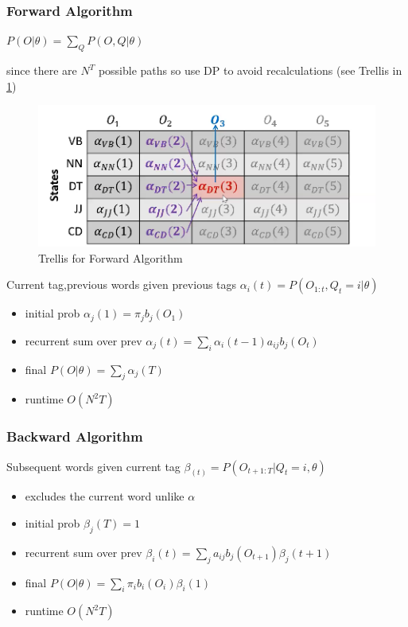 \documentclass[]{article}
\theoremstyle{definition}
\begin{document}
\subsubsection{Forward Algorithm}%
\label{ssub:forward_algorithm}

$P(O|\theta) = \sum_Q P(O,Q|\theta)$

since there are $N^T$ possible paths so use DP to avoid recalculations (see Trellis in \ref{fig:forward-trellis})

\begin{figure}[h]
    \centering
    \includegraphics[width=0.8\linewidth]{comp550/forward.png}
    \caption{Trellis for Forward Algorithm}%
    \label{fig:forward-trellis}
\end{figure}

Current tag,previous words given previous tags $\alpha_i(t) = P(O_{1:t},Q_t = i | \theta)$
\begin{itemize}
    \item initial prob $\alpha_j(1) = \pi_j b_j(O_1)$
    \item recurrent sum over prev $\alpha_j(t) = \sum_i \alpha_i(t-1) a_{ij} b_j(O_t)$
    \item final $P(O|\theta) = \sum_j \alpha_j(T)$
    \item runtime $O(N^2T)$
\end{itemize}

\subsubsection{Backward Algorithm}%
\label{ssub:backward_algorithm}

Subsequent words given current tag $\beta_(t) = P(O_{t+1:T} | Q_t = i, \theta)$
\begin{itemize}
    \item excludes the current word unlike $\alpha$
    \item initial prob $\beta_j(T) = 1$
    \item recurrent sum over prev $\beta_i(t) = \sum_j a_{ij} b_j(O_{t+1}) \beta_j(t + 1) $
    \item final $P(O|\theta) = \sum_i \pi_i b_i(O_i) \beta_i(1)$
    \item runtime $O(N^2T)$
\end{itemize}
\end{document}
